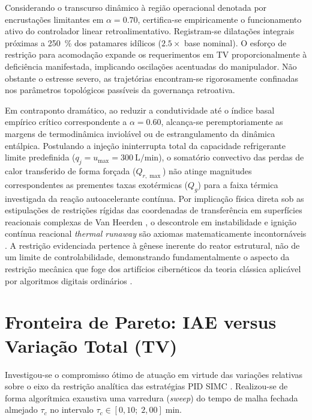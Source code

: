 Considerando o transcurso dinâmico à região operacional denotada por encrustações limitantes em $\alpha = 0.70$, certifica-se empiricamente o funcionamento ativo do controlador linear retroalimentativo. Registram-se dilatações integrais próximas a \SI{250}{\percent} dos patamares idílicos ($2.5\times$ base nominal). O esforço de restrição para acomodação expande os requerimentos em TV proporcionalmente à deficiência manifestada, implicando oscilações acentuadas do manipulador. Não obstante o estresse severo, as trajetórias encontram-se rigorosamente confinadas nos parâmetros topológicos passíveis da governança retroativa.

Em contraponto dramático, ao reduzir a condutividade até o índice basal empírico crítico correspondente a $\alpha = 0.60$, alcança-se peremptoriamente as margens de termodinâmica inviolável ou de estrangulamento da dinâmica entálpica. Postulando a injeção ininterrupta total da capacidade refrigerante limite predefinida ($q_j = u_{\max} = \SI{300}{\liter\per\minute}$), o somatório convectivo das perdas de calor transferido de forma forçada ($Q_{r,\max}$) não atinge magnitudes correspondentes as prementes taxas exotérmicas ($Q_g$) para a faixa térmica investigada da reação autoacelerante contínua. Por implicação física direta sob as estipulações de restrições rígidas das coordenadas de transferência em superfícies reacionais complexas de Van Heerden \cite{VanHeerden1953}, o descontrole em instabilidade e ignição contínua reacional \textit{thermal runaway} são axiomas matematicamente incontornáveis \cite{Luyben2007}. A restrição evidenciada pertence à gênese inerente do reator estrutural, não de um limite de controlabilidade, demonstrando fundamentalmente o aspecto da restrição mecânica que foge dos artifícios cibernéticos da teoria clássica aplicável por algoritmos digitais ordinários \cite{Morari1989}.

\section{Fronteira de Pareto: IAE versus Variação Total (TV)}
\label{sec:pareto_iae_tv}

Investigou-se o compromisso ótimo de atuação em virtude das variações relativas sobre o eixo da restrição analítica das estratégias PID SIMC \cite{Skogestad2003}. Realizou-se de forma algorítmica exaustiva uma varredura (\textit{sweep}) do tempo de malha fechada almejado $\tau_c$ no intervalo $\tau_c \in [0{,}10;\; 2{,}00]\;\si{\minute}$.

